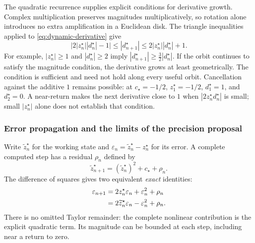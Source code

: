 The quadratic recurrence supplies explicit conditions for derivative growth.
Complex multiplication preserves magnitudes multiplicatively, so rotation
alone introduces no extra amplification in a Euclidean disk. The triangle
inequalities applied to \eqref{eq:dynamic-derivative} give
\begin{equation}
 \bigl|2|z_n^\star||d_n^\star|-1\bigr|
 \le |d_{n+1}^\star|
 \le 2|z_n^\star||d_n^\star|+1.
 \label{eq:dynamic-derivative-growth}
\end{equation}
For example, $|z_n^\star|\ge1$ and $|d_n^\star|\ge2$ imply
$|d_{n+1}^\star|\ge\tfrac32|d_n^\star|$. If the orbit continues to satisfy
the magnitude condition, the derivative grows at least geometrically.
The condition is sufficient and need not hold along every useful orbit.
Cancellation against the additive $1$ remains possible: at $c_\star=-1/2$,
$z_1^\star=-1/2$, $d_1^\star=1$, and $d_2^\star=0$.
A near-return makes the next derivative close to $1$ when
$|2z_n^\star d_n^\star|$ is small; small $|z_n^\star|$ alone does not
establish that condition.

\subsubsection{Error propagation and the limits of the precision proposal}

Write $\widetilde z_n^\star$ for the working state and
$\varepsilon_n=\widetilde z_n^\star-z_n^\star$ for its error. A complete
computed step has a residual $\rho_n$ defined by
\begin{equation}
 \widetilde z_{n+1}^\star=(\widetilde z_n^\star)^2+c_\star+\rho_n.
 \label{eq:dynamic-local-residual}
\end{equation}
The difference of squares gives two equivalent \emph{exact} identities:
\begin{align}
 \varepsilon_{n+1}
 &=2z_n^\star\varepsilon_n+\varepsilon_n^2+\rho_n \notag\\
 &=2\widetilde z_n^\star\varepsilon_n-\varepsilon_n^2+\rho_n.
 \label{eq:dynamic-exact-error}
\end{align}
There is no omitted Taylor remainder: the complete nonlinear contribution is
the explicit quadratic term. Its magnitude can be bounded at each
step, including near a return to zero.

